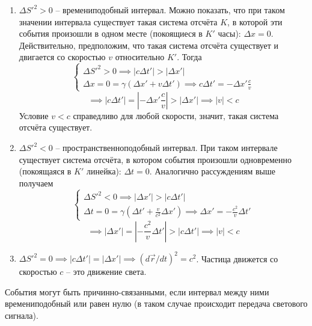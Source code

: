 \documentclass{article}
\begin{document}
\begin{enumerate}
    \item $\Delta S'^2 > 0$ -- времениподобный интервал. Можно показать, что при таком значении интервала существует такая система отсчёта $K$, в которой эти события произошли в одном месте (покоящиеся в $K'$ часы): $\Delta x=0$. Действительно, предположим, что такая система отсчёта существует и двигается со скоростью $v$ относительно $K'$. Тогда
    \begin{equation*}
        \begin{cases}
        \Delta S'^2 > 0 \implies |c\Delta t'| > |\Delta x'|\\
        \Delta x=0=\gamma\left(\Delta x'+v\Delta t'\right) \implies c\Delta t'=-\Delta x'\frac{c}{v}
        \end{cases}
    \end{equation*}
    \begin{equation*}
        \implies |c\Delta t'|=|-\Delta x'\frac{c}{v}|>|\Delta x'| \implies |v|<c
    \end{equation*}
    Условие $v<c$ справедливо для любой скорости, значит, такая система отсчёта существует.
    \item $\Delta S'^2 < 0$ -- пространственноподобный интервал. При таком интервале существует система отсчёта, в котором события произошли одновременно (покоящаяся в $K'$ линейка): $\Delta t=0$. Аналогично рассуждениям выше получаем
    \begin{equation*}
        \begin{cases}
        \Delta S'^2 < 0 \implies |\Delta x'|>|c\Delta t'|\\
        \Delta t=0=\gamma\left(\Delta t'+\frac{v}{c^2}\Delta x'\right) \implies \Delta x'=-\frac{c^2}{v}\Delta t'
        \end{cases}
    \end{equation*}
    \begin{equation*}
        \implies |\Delta x'|=|-\frac{c^2}{v}\Delta t'|>|c\Delta t'| \implies |v|<c
    \end{equation*}
    \item $\Delta S'^2 = 0 \implies |c\Delta t'|=|\Delta x'| \implies \left(d\vec{r}/dt\right)^2=c^2$. Частица движется со скоростью $c$ -- это движение света.
\end{enumerate}

События могут быть причинно-связанными, если интервал между ними времениподобный или равен нулю (в таком случае происходит передача светового сигнала).
\end{document}
